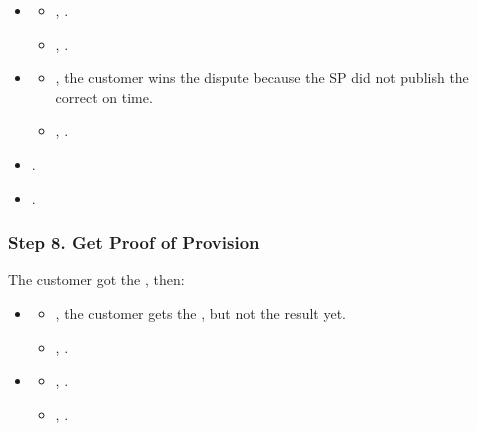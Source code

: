 \ActedAbnormallyThen{\sp}

\begin{itemize}
\item \AgreeablePath
  \begin{itemize}
    \item {}, \CustomerPaidButDidntGetResult{}.
    \item {}, \SpReceivedThePayment{}.
  \end{itemize}
\item \DisputePath
  \begin{itemize}
    \item {}, the customer wins the dispute because the SP did not publish the correct \PoP{} on time.
    \item {}, .
  \end{itemize}
\end{itemize}

\Fairness

\begin{itemize}
  \item {}.
  \item {}.
\end{itemize}


\subsubsection*{Step 8. \CustomerTurn{} Get Proof of Provision}\label{step-8-pull-proof-of-provision}

The customer got the \PoP{}, then:

\begin{itemize}
\item \AgreeablePath
  \begin{itemize}
    \item {}, the customer gets the \cid{}, but not the result yet.
    \item {}, .
  \end{itemize}
\item \DisputePath

  \begin{itemize}
    \item {}, \CustomerLosesBecauseSPCanProveBeingCorrect{}.
    \item {}, .
  \end{itemize}
\end{itemize}

